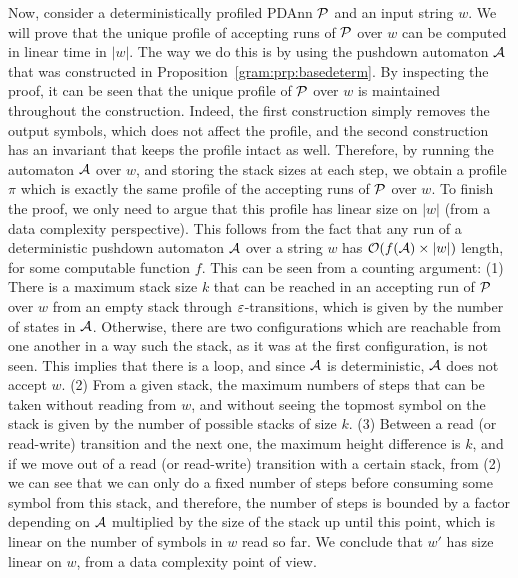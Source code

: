Now, consider a deterministically profiled PDAnn $\mathcal{P}$ and an input string $w$. We will prove that the unique profile of accepting runs of $\mathcal{P}$ over $w$ can be computed in linear time in $|w|$. The way we do this is by using the pushdown automaton $\mathcal{A}$ that was constructed in Proposition~\ref{gram:prp:basedeterm}. By inspecting the proof, it can be seen that the unique profile of $\mathcal{P}$ over $w$ is maintained throughout the construction. Indeed, the first construction simply removes the output symbols, which does not affect the profile, and the second construction has an invariant that keeps the profile intact as well. Therefore, by running the automaton $\mathcal{A}$ over $w$, and storing the stack sizes at each step, we obtain a profile $\pi$ which is exactly the same profile of the accepting runs of $\mathcal{P}$ over $w$. To finish the proof, we only need to argue that this profile has linear size on $|w|$ (from a data complexity perspective). This follows from the fact that any run of a deterministic pushdown automaton $\mathcal{A}$ over a string $w$ has $\mathcal{O}(f(\mathcal{A})\times|w|)$ length, for some computable function $f$. This can be seen from a counting argument: (1) There is a maximum stack size $k$ that can be reached in an accepting run of $\mathcal{P}$ over $w$ from an empty stack through $\varepsilon$-transitions, which is given by the number of states in $\mathcal{A}$. Otherwise, there are two configurations which are reachable from one another in a way such the stack, as it was at the first configuration, is not seen. This implies that there is a loop, and since $\mathcal{A}$ is deterministic, $\mathcal{A}$ does not accept $w$. (2) From a given stack, the maximum numbers of steps that can be taken without reading from $w$, and without seeing the topmost symbol on the stack is given by the number of possible stacks of size $k$. (3) Between a read (or read-write) transition and the next one, the maximum height difference is $k$, and if we move out of a read (or read-write) transition with a certain stack, from (2) we can see that we can only do a fixed number of steps before consuming some symbol from this stack, and therefore, the number of steps is bounded by a factor depending on $\mathcal{A}$ multiplied by the size of the stack up until this point, which is linear on the number of symbols in $w$ read so far. We conclude that $w'$ has size linear on $w$, from a data complexity point of view.

